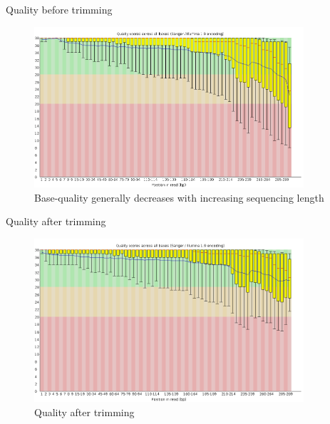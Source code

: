 \documentclass[presentation]{beamer}
\begin{document}
\begin{frame}[label=sec-2-1-11]{Quality before trimming}
\begin{figure}[htb]
\centering
\includegraphics[width=10cm]{RawImages/per_base_quality.png}
\caption{Base-quality generally decreases with increasing sequencing length}
\end{figure}
\end{frame}

\begin{frame}[label=sec-2-1-12]{Quality after trimming}
\begin{figure}[htb]
\centering
\includegraphics[width=10cm]{TrimmedImages/per_base_quality.png}
\caption{Quality after trimming}
\end{figure}
\end{frame}
\end{document}
